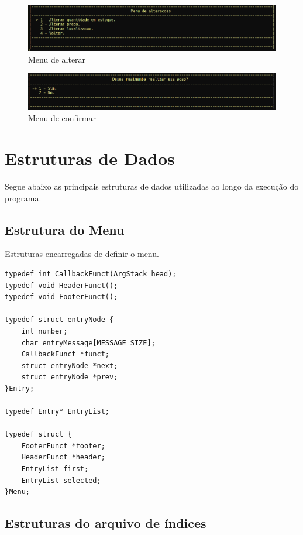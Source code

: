 \documentclass[12pt, a4paper]{article}
\begin{document}
\begin{figure}[!htb]
    \centering
    \includegraphics[width=\textwidth]{mudar}
    \caption{\label{fig:mudar}Menu de alterar}
\end{figure}

\begin{figure}[!htb]
    \centering
    \includegraphics[width=\textwidth]{confirmar}
    \caption{\label{fig:confirmar}Menu de confirmar}
\end{figure}

\cleardoublepage
\section{Estruturas de Dados}\label{Estruturas de Dados}

Segue abaixo as principais estruturas de dados utilizadas ao longo da execução do programa.

\subsection{Estrutura do Menu}\label{Estrutura do Menu}

Estruturas encarregadas de definir o menu.

\begin{lstlisting}
typedef int CallbackFunct(ArgStack head);
typedef void HeaderFunct();
typedef void FooterFunct();

typedef struct entryNode {
    int number;
	char entryMessage[MESSAGE_SIZE];
    CallbackFunct *funct;
    struct entryNode *next;
    struct entryNode *prev;
}Entry;

typedef Entry* EntryList;

typedef struct {
    FooterFunct *footer;
    HeaderFunct *header;
    EntryList first;
    EntryList selected;
}Menu;
\end{lstlisting}

\cleardoublepage
\subsection{Estruturas do arquivo de índices}\label{Estruturas do arquivo de índices}
\end{document}
